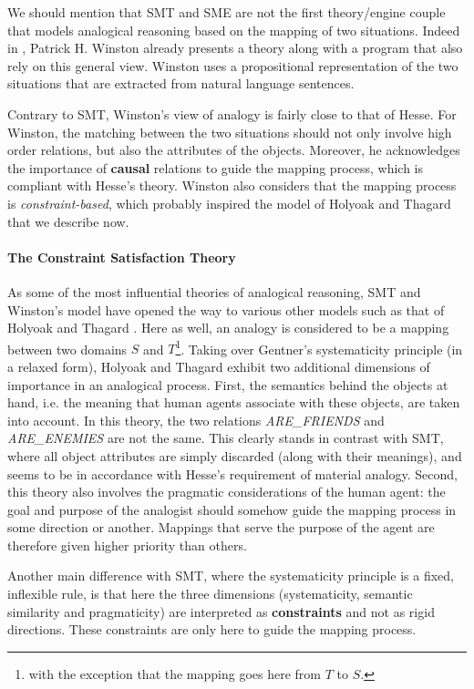 We should mention that SMT and SME are not the first theory/engine couple that
models analogical reasoning based on the mapping of two situations. Indeed in
\cite{Win80}, Patrick H. Winston already presents a theory along with a
program that also rely on this general view. Winston uses a propositional
representation of the two situations that are extracted from natural language
sentences.

Contrary to SMT, Winston's view of analogy is fairly close to that of Hesse.
For Winston, the matching between the two situations should not only involve
high order relations, but also the attributes of the objects. Moreover, he
acknowledges the importance of \textbf{causal} relations to guide the mapping
process, which is compliant with Hesse's theory. Winston also considers that
the mapping process is \textit{constraint-based}, which probably inspired the
model of Holyoak and Thagard that we describe now.

\paragraph{The Constraint Satisfaction Theory\\}

As some of the most influential theories of analogical reasoning, SMT and
Winston's model have opened the way to various other models such as that of
Holyoak and Thagard \cite{HolTha89}. Here as well, an analogy is considered to
be a mapping between two domains $S$ and $T$\footnote{with the exception that
the mapping goes here from $T$ to $S$.}. Taking over Gentner's systematicity
principle (in a relaxed form), Holyoak and Thagard exhibit two additional
dimensions of importance in an analogical process. First, the semantics behind
the objects at hand, i.e.  the meaning that human agents associate with these
objects, are taken into account. In this theory, the two relations
\textit{ARE\_FRIENDS} and \textit{ARE\_ENEMIES} are not the same. This clearly
stands in contrast with SMT, where all object attributes are simply discarded
(along with their meanings), and seems to be in accordance with Hesse's
requirement of material analogy. Second, this theory also involves the
pragmatic considerations of the human agent: the goal and purpose of the
analogist should somehow guide the mapping process in some direction or
another. Mappings that serve the purpose of the agent are therefore given
higher priority than others.

Another main difference with SMT, where the systematicity principle is a fixed,
inflexible rule, is that here the three dimensions (systematicity, semantic
similarity and pragmaticity) are interpreted as \textbf{constraints} and not as
rigid directions. These constraints are only here to guide the mapping process.

